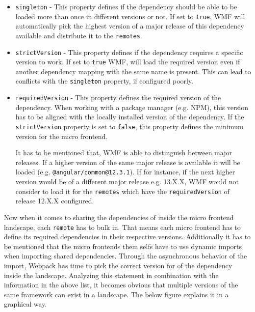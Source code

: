 \begin{itemize}
	\item \texttt{singleton} - This property defines if the dependency should be able to be loaded more than once in different versions or not. If set to \texttt{true}, WMF will automatically pick the highest version of a major release of this dependency available and distribute it to the \texttt{remotes}.\cite{wmf_version_mismatch}
	
	\item \texttt{strictVersion} - This property defines if the dependency requires a specific version to work. If set to \texttt{true} WMF, will load the required version even if another dependency mapping with the same name is present. This can lead to conflicts with the \texttt{singleton} property, if configured poorly.
	
	\item \texttt{requiredVersion} - This property defines the required version of the dependency. When working with a package manager (e.g. NPM), this version has to be aligned with the locally installed version of the dependency. If the \texttt{strictVersion} property is set to \texttt{false}, this property defines the minimum version for the micro frontend. 
	
	It has to be mentioned that, WMF is able to distinguish between major releases. If a higher version of the same major release is available it will be loaded (e.g. \texttt{@angular/common@12.3.1}). If for instance, if the next higher version would be of a different major release e.g. 13.X.X, WMF would not consider to load it for the \texttt{remotes} which have the \texttt{requiredVersion} of release 12.X.X configured.
\end{itemize}

Now when it comes to sharing the dependencies of inside the micro frontend landscape, each \texttt{remote} has to bulk in. That means each micro frontend has to define its required dependencies in their respective versions. Additionally it has to be mentioned that the micro frontends them selfs have to use dynamic imports when importing shared dependencies. Through the asynchronous behavior of the import, Webpack has time to pick the correct version for of the dependency inside the landscape.\cite{wmf_concepts}
Analyzing this statement in combination with the information in the above list, it becomes obvious that multiple versions of the same framework can exist in a landscape. The below figure explains it in a graphical way.


